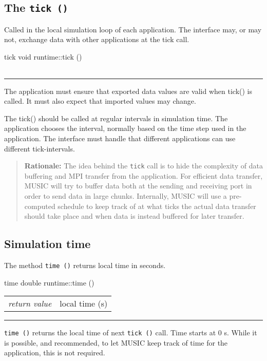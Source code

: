 \documentclass[a4paper]{report}
\makeatletter
\newenvironment{rationale}%
{\par\begin{quote}\textbf{Rationale:}}%
{\par\end{quote}}
\newenvironment{parameters}%
{\begin{tabular}{@{\hspace{2em}}lp{0.6\textwidth}}}%
{\end{tabular}\par\vspace{1mm}\par\hrule\par\vspace{5mm}}
\makeatother
\begin{document}
\subsection{The \lstinline|tick ()|}

Called in the local simulation loop of each application.  The
interface may, or may not, exchange data with other applications at
the tick call.

\begin{head}{tick}
  void runtime::tick ()
\end{head}
\begin{parameters}
\end{parameters}

The application must ensure that exported data values are valid when
tick() is called.  It must also expect that imported values may change.

The tick() should be called at regular intervals in simulation time.
The application chooses the interval, normally based on the time step
used in the application.  The interface must handle that different
applications can use different tick-intervals.

\begin{rationale}
  The idea behind the \lstinline|tick| call is to hide the complexity
  of data buffering and MPI transfer from the application.  For
  efficient data transfer, MUSIC will try to buffer data both at the
  sending and receiving port in order to send data in large chunks.
  Internally, MUSIC will use a pre-computed schedule to keep track of
  at what ticks the actual data transfer should take place and when
  data is instead buffered for later transfer.
\end{rationale}


\subsection{Simulation time}

The method \lstinline|time ()| returns local time in seconds.

\begin{head}{time}
  double runtime::time ()
\end{head}
\begin{parameters}
  \emph{return value} & local time (s) \\
\end{parameters}

\lstinline|time ()| returns the local time of next \lstinline|tick ()|
call.  Time starts at 0 s.  While it is possible, and recommended, to
let MUSIC keep track of time for the application, this is not
required.
\end{document}
